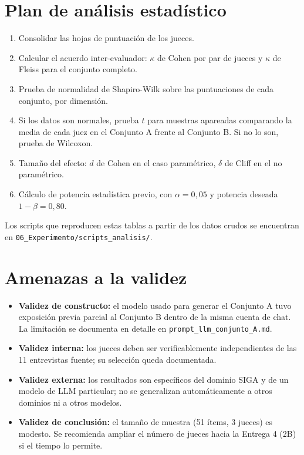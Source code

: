 \documentclass[11pt,a4paper]{article}
\begin{document}
\section{Plan de análisis estadístico}
\begin{enumerate}[leftmargin=*]
  \item Consolidar las hojas de puntuación de los jueces.
  \item Calcular el acuerdo inter-evaluador: $\kappa$ de Cohen por par de jueces y
        $\kappa$ de Fleiss para el conjunto completo.
  \item Prueba de normalidad de Shapiro-Wilk sobre las puntuaciones de cada conjunto,
        por dimensión.
  \item Si los datos son normales, prueba $t$ para muestras apareadas comparando la
        media de cada juez en el Conjunto A frente al Conjunto B. Si no lo son,
        prueba de Wilcoxon.
  \item Tamaño del efecto: $d$ de Cohen en el caso paramétrico, $\delta$ de Cliff en
        el no paramétrico.
  \item Cálculo de potencia estadística previo, con $\alpha = 0{,}05$ y potencia
        deseada $1-\beta = 0{,}80$.
\end{enumerate}

Los scripts que reproducen estas tablas a partir de los datos crudos se encuentran en
\texttt{06\_Experimento/scripts\_analisis/}.

\section{Amenazas a la validez}
\begin{itemize}[leftmargin=*]
  \item \textbf{Validez de constructo:} el modelo usado para generar el Conjunto A
        tuvo exposición previa parcial al Conjunto B dentro de la misma cuenta de
        chat. La limitación se documenta en detalle en
        \texttt{prompt\_llm\_conjunto\_A.md}.
  \item \textbf{Validez interna:} los jueces deben ser verificablemente independientes
        de las 11 entrevistas fuente; su selección queda documentada.
  \item \textbf{Validez externa:} los resultados son específicos del dominio SIGA y de
        un modelo de LLM particular; no se generalizan automáticamente a otros
        dominios ni a otros modelos.
  \item \textbf{Validez de conclusión:} el tamaño de muestra (51 ítems, 3 jueces) es
        modesto. Se recomienda ampliar el número de jueces hacia la Entrega 4 (2B) si
        el tiempo lo permite.
\end{itemize}
\end{document}
